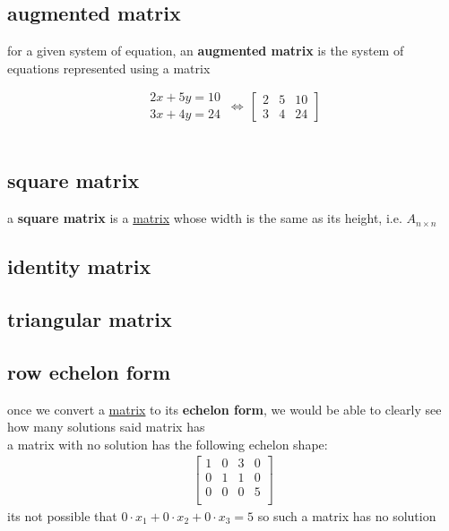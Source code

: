 \documentclass[a4paper,12pt]{article}
\begin{document}
\subsection{augmented matrix}
\label{sec:org83db26e}
\begin{definition}
for a given system of equation, an \textbf{augmented matrix} is the system of equations represented using a matrix\\
\begin{my_example}
\[
  \begin{aligned} 2x+5y=10\\ 3x+4y=24 \end{aligned} \,\iff\, \left[\begin{array}{cc|c} 2 & 5 & 10\\ 3 & 4 & 24 \end{array}\right]
\]\\
\end{my_example}
\end{definition}
\subsection{square matrix}
\label{sec:orgf670bc9}
\begin{definition}
a \textbf{square matrix} is a \hyperref[sec:org2833a15]{matrix} whose width is the same as its height, i.e. \(A_{n\times n}\)\\
\end{definition}
\subsection{identity matrix}
\label{sec:org15aa549}
\subsection{triangular matrix}
\label{sec:orgbc7aa60}
\subsection{row echelon form}
\label{sec:orgc9a3364}
\begin{characteristic}
once we convert a \hyperref[sec:org2833a15]{matrix} to its \textbf{echelon form}, we would be able to clearly see how many solutions said matrix has\\
a matrix with no solution has the following echelon shape:\\
\begin{gather*}
  \left[
    \begin{array}{ccc|c}
      1 & 0 & 3 & 0 \\
      0 & 1 & 1 & 0 \\
      0 & 0 & 0 & 5 \\
    \end{array}
  \right]
\end{gather*}
its not possible that \(0 \cdot x_1 + 0 \cdot x_2 + 0 \cdot x_3 = 5\) so such a matrix has no solution\\
\end{characteristic}
\end{document}
